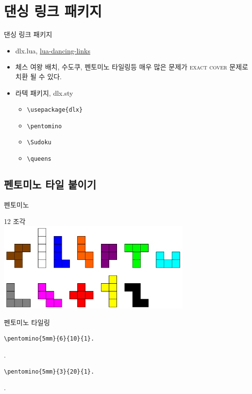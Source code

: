 \documentclass[xcolor=svgnames]{beamer}
\begin{document}
%
\section{댄싱 링크 패키지}

%
\begin{frame}[fragile]{댄싱 링크 패키지}
  \begin{itemize}
    \setlength\itemsep{1em}
  \item \alert{dlx.lua,} \href{https://github.com/sjnam/lua-dancing-links}
    {lua-dancing-links}
  \item 체스 여왕 배치, 수도쿠, 펜토미노 타일링등 매우 많은 문제가
    \textsc{exact cover} 문제로 치환 될 수 있다.
  \item 라텍 패키지, \alert{dlx.sty}
    \begin{itemize}
    \item \verb|\usepackage{dlx}|
    \item \verb|\pentomino|
    \item \verb|\Sudoku|
    \item \verb|\queens|
    \end{itemize}
  \end{itemize}
\end{frame}

%
\subsection{펜토미노 타일 붙이기}

%
\begin{frame}{펜토미노}
  \begin{center}
  {\Large 12 조각} \\
  \includegraphics[height=4.5cm]{imgs/pentominoes.png}
  \end{center}
\end{frame}

%
\begin{frame}[fragile]{펜토미노 타일링}
\begin{verbatim}
\pentomino{5mm}{6}{10}{1}.
\end{verbatim}
\vspace{-5mm}
.
\vspace{-5mm}
\begin{verbatim}
\pentomino{5mm}{3}{20}{1}.
\end{verbatim}
\vspace{-5mm}
.
\end{frame}
\end{document}
